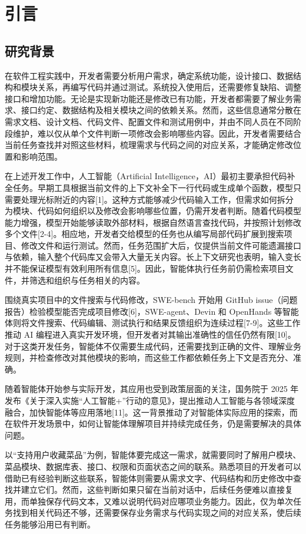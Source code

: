 \chapter{引言}


\section{研究背景}
在软件工程实践中，开发者需要分析用户需求，确定系统功能，设计接口、数据结构和模块关系，再编写代码并通过测试。系统投入使用后，还需要修复缺陷、调整接口和增加功能。无论是实现新功能还是修改已有功能，开发者都需要了解业务需求、接口约定、数据结构及相关模块之间的依赖关系。然而，这些信息通常分散在需求文档、设计文档、代码文件、配置文件和测试用例中，并由不同人员在不同阶段维护，难以仅从单个文件判断一项修改会影响哪些内容。因此，开发者需要结合当前任务查找并对照这些材料，梳理需求与代码之间的对应关系，才能确定修改位置和影响范围。

在上述开发工作中，人工智能（Artificial Intelligence，AI）最初主要承担代码补全任务。早期工具根据当前文件的上下文补全下一行代码或生成单个函数，模型只需要处理光标附近的内容[1]。这种方式能够减少代码输入工作，但需求如何拆分为模块、代码如何组织以及修改会影响哪些位置，仍需开发者判断。随着代码模型能力增强，模型开始能够读取外部材料，根据自然语言查找代码，并按照计划修改多个文件[2-4]。相应地，开发者交给模型的任务也从编写局部代码扩展到搜索项目、修改文件和运行测试。然而，任务范围扩大后，仅提供当前文件可能遗漏接口与依赖，输入整个代码库又会带入大量无关内容。长上下文研究也表明，输入变长并不能保证模型有效利用所有信息[5]。因此，智能体执行任务前仍需检索项目文件，并筛选和组织与任务相关的内容。

围绕真实项目中的文件搜索与代码修改，SWE-bench 开始用 GitHub issue（问题报告）检验模型能否完成项目修改[6]，SWE-agent、Devin 和 OpenHands 等智能体则将文件搜索、代码编辑、测试执行和结果反馈组织为连续过程[7-9]。这些工作推动 AI 编程进入真实开发环境，但开发者对其输出准确性的信任仍然有限[10]。对于这类开发任务，智能体不仅需要生成代码，还需要找到正确的文件、理解业务规则，并检查修改对其他模块的影响，而这些工作都依赖任务上下文是否充分、准确。

随着智能体开始参与实际开发，其应用也受到政策层面的关注，国务院于 2025 年发布《关于深入实施“人工智能+”行动的意见》，提出推动人工智能与各领域深度融合，加快智能体等应用落地[11]。这一背景推动了对智能体实际应用的探索，而在软件开发场景中，如何让智能体理解项目并持续完成任务，仍是需要解决的具体问题。

以“支持用户收藏菜品”为例，智能体要完成这一需求，就需要同时了解用户模块、菜品模块、数据库表、接口、权限和页面状态之间的联系。熟悉项目的开发者可以借助已有经验判断这些联系，智能体则需要从需求文字、代码结构和历史修改中查找并建立它们。然而，这些判断如果只留在当前对话中，后续任务便难以直接复用，而单独保存代码文本，又难以说明代码对应哪项业务能力。因此，仅为单次任务找到相关代码还不够，还需要保存业务需求与代码实现之间的对应关系，使后续任务能够沿用已有判断。

